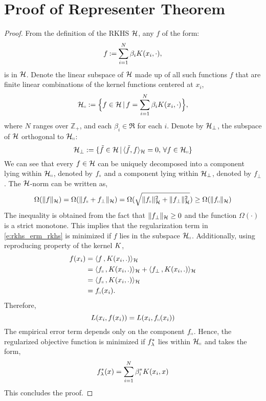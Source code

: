 \chapter{Proof of Representer Theorem}%
\label{a:rep_theorem}

\begin{proof}
	From the definition of the RKHS ${\cal H}$, any $f$ of the form:
	\[
	f \mathbin{:=} \sum_{i=1}^N  
	\beta_i K(x_i,\cdot),
	\]
	is in ${\cal H}$. 	
	Denote the linear subspace of ${\cal H}$ made up of all such functions $f$ that are finite linear combinations of the kernel functions centered at $x_i$,
	\[
	{\cal H}_\shortparallel := \Bigl\{f \in {\cal H}\, |\, f = \sum_{i=1}^N  \beta_i K(x_i,\cdot) \Bigr\},
	\]
	where $N$ ranges over $\mathbb{Z}_+$, and  each $\beta_i \in \Re$ for each $i$. Denote by ${\cal H}_{\perp}$, the subspace of ${\cal H}$ orthogonal to ${\cal H}_\shortparallel$:
	\[
	{\cal H}_\perp : = \{ \tilde f \in {\cal H}\,| \, \langle \tilde f , f \rangle_{\cal H} = 0 ,\, \forall f \in {\cal H}_\shortparallel \}
	\]
	We can see that every $f \in {\cal H}$ can be uniquely decomposed into a component lying within ${\cal H}_\shortparallel$, denoted by $f_\shortparallel$ and a component lying within ${\cal H}_\perp$, denoted by $f_\perp$.
	The ${\cal H}$-norm can be written as,
	\[
	\Omega(\|f\|_{\cal H}) = \Omega( \|f_\shortparallel + f_\perp\|_{\cal H}) =\Omega( \sqrt{\|f_\shortparallel\|^2_{\cal H} + \|f_\perp\|^2_{\cal H}})  \geq \Omega(\|f_\shortparallel\|_{\cal H})
	\]
	The inequality is obtained from the fact that $\|f_\perp\|_{\cal H} \geq 0$ and the function $\Omega(\cdot)$ is a strict monotone.
	This implies that the regularization term in \eqref{e:rkhs_erm_rkhs} is minimized if $f$ lies in the subspace ${\cal H}_\shortparallel$.
	Additionally, using reproducing property of the kernel $K$,
	\[
	\begin{aligned}
	f(x_i) & =  \langle f \, , K(x_i,.) \rangle_{\cal H}\\
	&  = \langle f_\shortparallel\, , K(x_i,.) \rangle_{\cal H} + \langle f_\perp \, , K(x_i,.) \rangle_{\cal H} \\
	&  = \langle f_\shortparallel\, , K(x_i,.) \rangle_{\cal H} \\
	&  = f_\shortparallel(x_i).
	\end{aligned}
	\]
	Therefore,
	\[
	L(x_i, f(x_i)) = L(x_i, f_\shortparallel(x_i))
	\]
	The empirical error term depends only on the component $f_\shortparallel$. Hence, the regularized objective function is minimized if $f_\lambda^*$ lies within ${\cal H}_\shortparallel$ and takes the form,
	\[
	f_\lambda^*(x) = \sum_{i=1}^N  \beta_i^*  K(x_i, x)
	\]
	This concludes the proof. 
\end{proof}